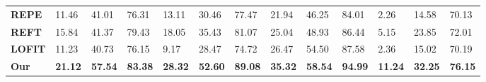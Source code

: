 \begin{table}[!thp]
{\begin{tabular}{lllllllllllll}
\textbf{REPE}       & 11.46                    & 41.01                       & 76.31                         & 13.11                    & 30.46                       & 77.47                         & 21.94                    & 46.25                       & 84.01                         & 2.26                     & 14.58                       & 70.13                         \\
\textbf{REFT}       & 15.84                    & 41.37                       & 79.43                         & 18.05                    & 35.43                       & 81.07                         & 25.04                    & 48.93                       & 86.44                         & 5.15                     & 23.85                       & 72.01                         \\
\textbf{LOFIT}      & 11.23                    & 40.73                       & 76.15                         & 9.17                     & 28.47                       & 74.72                         & 26.47                    & 54.50                       & 87.58                         & 2.36                     & 15.02                       & 70.19                         \\
\midrule
\textbf{Our}        & \textbf{21.12}           & \textbf{57.54}              & \textbf{83.38}                & \textbf{28.32}           & \textbf{52.60}              & \textbf{89.08}                & \textbf{35.32}           & \textbf{58.54}              & \textbf{94.99}                & \textbf{11.24}           & \textbf{32.25}              & \textbf{76.15}     \\
\bottomrule
\end{tabular}
}
\end{table}
